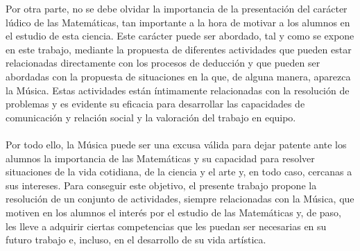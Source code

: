 \documentclass[a4paper, openright, 11pt, titlepage]{report}
\theoremstyle{definition}\newtheorem{defin}[propo]{Definition}
\theoremstyle{definition}\newtheorem{obser}[propo]{Remark}
\theoremstyle{definition}\newtheorem{ejem}[propo]{Ejemplo}
\theoremstyle{definition}\newtheorem{algoritmo}[propo]{Algoritmo}
\begin{document}
Por otra parte, no se debe olvidar la importancia de la presentación del carácter lúdico de las Matemáticas, tan importante a la hora de motivar a los alumnos en el estudio de esta ciencia. Este carácter puede ser abordado, tal y como se expone en este trabajo, mediante la propuesta de diferentes actividades que pueden estar relacionadas directamente con los procesos de deducción y que pueden ser abordadas con la propuesta de situaciones en la que, de alguna manera, aparezca la Música. Estas actividades están íntimamente relacionadas con la resolución de problemas y es evidente su eficacia para desarrollar las capacidades de comunicación y relación social y la valoración del trabajo en equipo.\\\\
Por todo ello, la Música puede ser una excusa válida para dejar patente ante los alumnos la importancia de las Matemáticas y su capacidad para resolver situaciones de la vida cotidiana, de la ciencia y el arte y, en todo caso, cercanas a sus intereses. Para conseguir este objetivo, el presente trabajo propone la resolución de un conjunto de actividades, siempre relacionadas con la Música, que motiven en los alumnos el interés por el estudio de las Matemáticas y, de paso, les lleve a adquirir ciertas competencias que les puedan ser necesarias en su futuro trabajo e, incluso, en el desarrollo de su vida artística.
\end{document}
